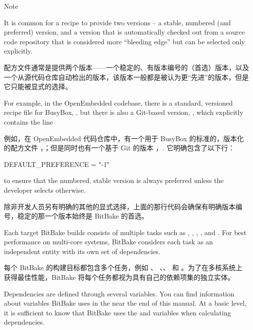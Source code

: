 \begin{noteblock}{Note}%

It is common for a recipe to provide two versions – a stable, numbered (and preferred) version, and a version that is automatically checked out from a source code repository that is considered more ``bleeding edge'' but can be selected only explicitly.

\medskip
配方文件通常是提供两个版本——一个稳定的、有版本编号的（首选）版本，以及一个从源代码仓库自动检出的版本，该版本一般都是被认为更“先进”的版本，但是它只能被显式的选择。

\medskip
For example, in the OpenEmbedded codebase, there is a standard, versioned recipe file for BusyBox, , but there is also a Git-based version, , which explicitly contains the line

\medskip
例如，在 OpenEmbedded 代码仓库中，有一个用于 BusyBox 的标准的，版本化的配方文件 ，；但是同时也有一个基于 Git 的版本 ，. 它明确包含了以下行：

\medskip
\begin{pyglist}
DEFAULT_PREFERENCE = "-1"
\end{pyglist}

\medskip
to ensure that the numbered, stable version is always preferred unless the developer selects otherwise.

\medskip
除非开发人员另有明确的其他的显式选择，上面的那行代码会确保有明确版本编号，稳定的那一个版本始终是 BitBake 的首选。
\end{noteblock}


Each target BitBake builds consists of multiple tasks such as , , , , and . For best performance on multi-core systems, BitBake considers each task as an independent entity with its own set of dependencies.

每个 BitBake 的构建目标都包含多个任务，例如 、 、、 和 。为了在多核系统上获得最佳性能，BitBake 将每个任务都视为具有自己的依赖项集的独立实体。

Dependencies are defined through several variables. You can find information about variables BitBake uses in the  near the end of this manual. At a basic level, it is sufficient to know that BitBake uses the  and  variables when calculating dependencies.

